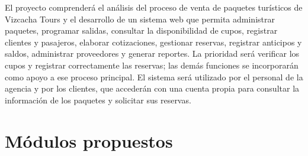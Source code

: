 \label{cap:alcances}

El proyecto comprenderá el análisis del proceso de venta de
paquetes turísticos de Vizcacha Tours y el desarrollo de un sistema web que
permita administrar paquetes, programar salidas, consultar la disponibilidad
de cupos, registrar clientes y pasajeros, elaborar cotizaciones, gestionar
reservas, registrar anticipos y saldos, administrar proveedores y generar
reportes. La prioridad será verificar los cupos y registrar correctamente las
reservas; las demás funciones se incorporarán como apoyo a ese proceso
principal. El sistema será utilizado por el personal de la agencia y por los
clientes, que accederán con una cuenta propia para consultar la información
de los paquetes y solicitar sus reservas.

\section*{Módulos propuestos}

